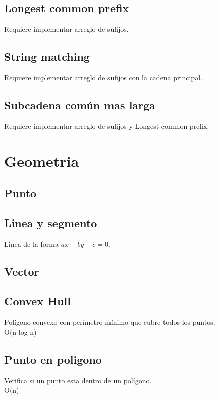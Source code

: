 \documentclass[10pt,landscape,twocolumn,a4paper,notitlepage]{article}
\newcommand\cppfile[2][]{

}
\begin{document}
			\subsection{Longest common prefix}
			Requiere implementar arreglo de sufijos.
			\cppfile[50-65]{cadenas/Arreglo_de_sufijos.cpp}
			\subsection{String matching}
			Requiere implementar arreglo de sufijos con la cadena principal.
			\cppfile[92-114]{cadenas/Arreglo_de_sufijos.cpp}
			\subsection{Subcadena común mas larga}
			Requiere implementar arreglo de sufijos y Longest common prefix.
			\cppfile[67-89]{cadenas/Arreglo_de_sufijos.cpp}
			
		\section{Geometria}
			\subsection{Punto}
			\cppfile[22-59]{geometria/punto.cpp}
			\subsection{Linea y segmento}
			Linea de la forma $ax + by + c = 0$.
			\cppfile[42-105]{geometria/linea.cpp}
			\subsection{Vector}
			\cppfile[39-67]{geometria/vector.cpp}
			\subsection{Convex Hull}
			Polígono convexo con perímetro mínimo que cubre todos los puntos.\\
			O(n log n)
			\cppfile[48-79]{geometria/convex_hull.cpp}
			\subsection{Punto en poligono}
			Verifica si un punto esta dentro de un polígono.\\
			O(n)
			\cppfile[67-76]{geometria/poligono.cpp}
			
\end{document}
